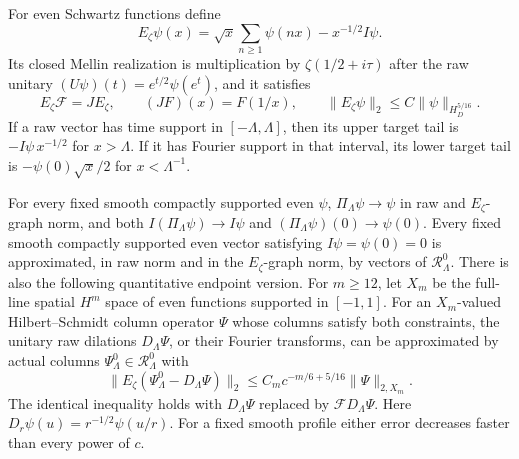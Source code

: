\begin{lemma}
\label{AC-T42}
For even Schwartz functions define
\[
 E_\zeta\psi(x)=\sqrt{x}\sum_{n\geq1}\psi(nx)
                         -x^{-1/2}I\psi .
 \tag{TP.2}
\]
Its closed Mellin realization is multiplication by
\(\zeta(1/2+i\tau)\) after the raw unitary
\((U\psi)(t)=e^{t/2}\psi(e^t)\), and it satisfies
\[
 E_\zeta\mathcal F=J E_\zeta,\qquad
 (JF)(x)=F(1/x),\qquad
 \|E_\zeta\psi\|_2\leq C\|\psi\|_{H_D^{5/16}} .
 \tag{TP.3}
\]
If a raw vector has time support in \([-\Lambda,\Lambda]\),
then its upper target tail is
\(-I\psi\,x^{-1/2}\) for \(x>\Lambda\).
If it has Fourier support in that interval, its lower
target tail is
\(-\psi(0)\sqrt{x}/2\) for \(x<\Lambda^{-1}\).

For every fixed smooth compactly supported even \(\psi\),
\(\Pi_\Lambda\psi\to\psi\) in raw and \(E_\zeta\)-graph
norm, and both \(I(\Pi_\Lambda\psi)\to I\psi\) and
\((\Pi_\Lambda\psi)(0)\to\psi(0)\).
Every fixed smooth compactly supported even vector satisfying
\(I\psi=\psi(0)=0\) is approximated, in raw norm and in the
\(E_\zeta\)-graph norm, by vectors of \(\mathcal R_\Lambda^0\).
There is also the following quantitative endpoint version.
For \(m\geq12\), let \(X_m\) be the full-line spatial \(H^m\)
space of even functions supported in \([-1,1]\).
For an \(X_m\)-valued Hilbert--Schmidt column operator \(\Psi\)
whose columns satisfy both constraints, the unitary raw
dilations \(D_\Lambda\Psi\), or their Fourier transforms,
can be approximated by actual columns
\(\Psi_\Lambda^0\in\mathcal R_\Lambda^0\) with
\[
 \|E_\zeta(\Psi_\Lambda^0-D_\Lambda\Psi)\|_2
 \leq C_m c^{-m/6+5/16}\|\Psi\|_{2,X_m}.
 \tag{TP.4}
\]
The identical inequality holds with
\(D_\Lambda\Psi\) replaced by
\(\mathcal F D_\Lambda\Psi\).
Here \(D_r\psi(u)=r^{-1/2}\psi(u/r)\).
For a fixed smooth profile either error decreases faster
than every power of \(c\).
\end{lemma}
